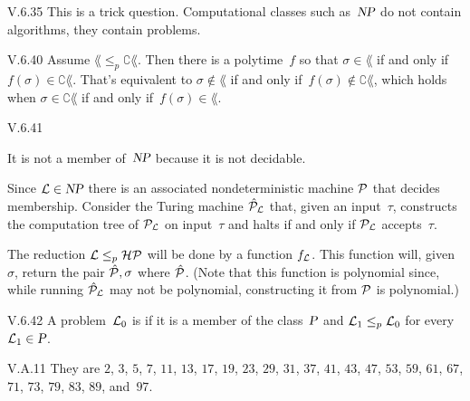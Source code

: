 %
\begin{ans}{V.6.35}
This is a trick question.
Computational classes such as~$\NP$ do not contain algorithms, they
contain problems.
\end{ans}
%
%
%
%
%
\begin{ans}{V.6.40}
Assume $\lang\leq_p\complement{\lang}$.
Then there is a polytime~$f$ so that
$\sigma\in\lang$ if and only if~$f(\sigma)\in\complement{\lang}$.
That's equivalent to
$\sigma\notin\lang$ if and only if~$f(\sigma)\notin\complement{\lang}$,
which holds when
$\sigma\in\complement{\lang}$ if and only if~$f(\sigma)\in\lang$.
\end{ans}
%
\begin{ans}{V.6.41}
\begin{exparts}
\item It is not a member of~$\NP$ because it is not decidable.
\item Since $\prob\in\NP$ there is an associated nondeterministic
  machine $\TM$ that decides membership.
  Consider the Turing machine $\hat{\TM}_{\prob}$ that, given an input~$\tau$,
  constructs the computation
  tree of $\TM_{\prob}$ on input~$\tau$ and halts if and only if
  $\TM_{\prob}$ accepts~$\tau$.

  The reduction $\prob\leq_p\prob[HP]$ will be done by a function $f_{\prob}$.
  This function will, given~$\sigma$, return
  the pair $\hat{\TM},\sigma$ where $\hat{\TM}$.
  (Note that this function is polynomial since,
  while running $\hat{\TM}_{\prob}$ may not be polynomial,
  constructing it from $\TM$ is polynomial.)
\end{exparts}
\end{ans}
%
\begin{ans}{V.6.42}
A problem~$\prob[L]_0$ is  if it is a member of the
class~$\P$ and $\prob[L]_1\leq_p\prob[L]_0$ for every $\prob[L]_1\in\P$.
\end{ans}
%
%
\begin{ans}{V.A.11}
They are
$2$, $3$, $5$, $7$, $11$, $13$, $17$, $19$, $23$, $29$, $31$, $37$, $41$,
$43$, $47$, $53$, $59$, $61$, $67$, $71$, $73$, $79$, $83$, $89$, and~$97$.
\end{ans}
%
